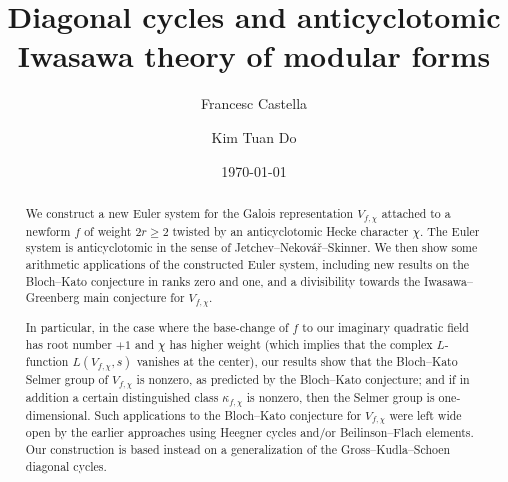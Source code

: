 \documentclass[10pt,letterpaper]{amsart}
\theoremstyle{plain}
\theoremstyle{definition}
\theoremstyle{definition}
\theoremstyle{plain}
\theoremstyle{plain}
\theoremstyle{plain}
\theoremstyle{remark}
\numberwithin{equation}{section}
\begin{document}
	
\title{Diagonal cycles and anticyclotomic Iwasawa theory of modular forms}
\author[F.\,Castella]{Francesc Castella}
\author[K.\,T.\,Do]{Kim Tuan Do}
	
\date{\today} %
		
\address[]{Department of Mathematics, University of California Santa Barbara, CA 93106, USA}
\address[]{Department of Mathematics, University of California Los Angeles, CA 90095, USA}
\address[]{Department of Mathematics, University of California Santa Barbara, CA 93106, USA}




\begin{abstract}
We construct a new Euler system for the Galois representation $V_{f,\chi}$ attached to a newform $f$ of weight $2r\geq 2$ twisted by an anticyclotomic Hecke character $\chi$. The Euler system is anticyclotomic in the sense of Jetchev--Nekov\'a{\v r}--Skinner. We then show some arithmetic applications of the constructed Euler system, including new results on the Bloch--Kato conjecture in ranks zero and one, and a divisibility towards the Iwasawa--Greenberg main conjecture for $V_{f,\chi}$. 

In particular, in the case where the base-change of $f$ to our imaginary quadratic field  has root number $+1$  and $\chi$ has higher weight (which implies that the complex $L$-function $L(V_{f,\chi},s)$ vanishes at the center), our results show that the Bloch--Kato Selmer group of $V_{f,\chi}$ is nonzero, as predicted by the Bloch--Kato conjecture; and if in addition a certain distinguished class $\kappa_{f,\chi}$ is nonzero, then the Selmer group is one-dimensional. Such applications to the Bloch--Kato conjecture for $V_{f,\chi}$ were left wide open by the earlier approaches using Heegner cycles and/or Beilinson--Flach elements. Our construction is based instead on a generalization of the Gross--Kudla--Schoen diagonal cycles.
\end{abstract}

\end{document}
